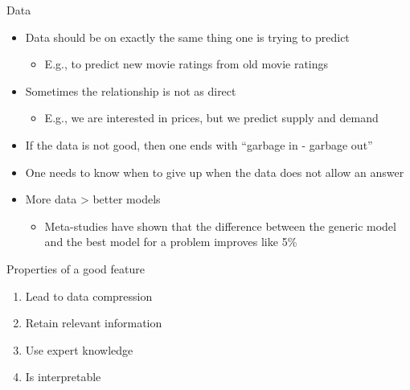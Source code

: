\documentclass[aspectratio=169, xcolor=dvipsnames]{beamer}
\begin{document}
  \begin{frame}{Data}
    \begin{itemize}
      \item Data should be on exactly the same thing one is trying to predict
        \begin{itemize}
          \item E.g., to predict new movie ratings from old movie ratings
        \end{itemize}

      \item Sometimes the relationship is not as direct
        \begin{itemize}
          \item E.g., we are interested in prices, but we predict supply and
            demand
        \end{itemize}

      \item If the data is not good, then one ends with ``garbage in - garbage out''

      \item One needs to know when to give up when the data does not allow an answer

      \item More data \textgreater{} better models
        \begin{itemize}
          \item Meta-studies have shown that the difference between the generic model
            and the best model for a problem improves like 5\%
        \end{itemize}
    \end{itemize}
  \end{frame}

  \begin{frame}{Properties of a good feature}
    \begin{enumerate}
      \def\labelenumi{\arabic{enumi}.}

      \item Lead to data compression

      \item Retain relevant information

      \item Use expert knowledge

      \item Is interpretable
    \end{enumerate}
  \end{frame}
\end{document}
